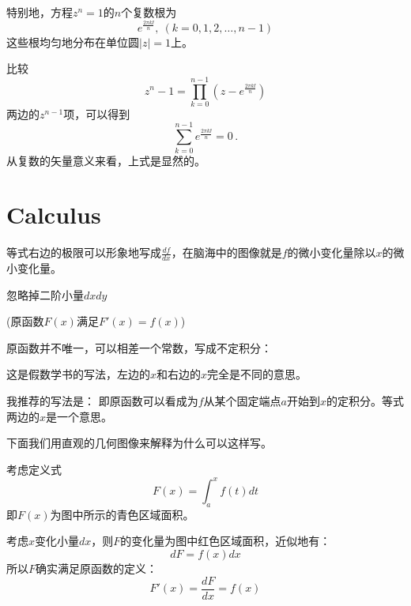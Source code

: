 \documentclass[CJK]{beamer}
\begin{document}
\begin{frame}
\bch
特别地，方程$z^n=1$的$n$个复数根为
$$e^{\frac{2\pi k \ii}{n}}, \ (k=0,1,2,\ldots,n-1)$$
这些根均匀地分布在单位圆$|z|=1$上。

比较
$$z^n-1 = \prod_{k=0}^{n-1}\left(z-e^{\frac{2\pi k \ii}{n}}\right)$$
两边的$z^{n-1}$项，可以得到
$$\sum_{k=0}^{n-1} e^{\frac{2\pi k \ii}{n}} = 0\, .$$
从复数的矢量意义来看，上式是显然的。
\ech
\end{frame}


\section{Calculus}

\begin{frame}
\bch
{}

等式右边的极限可以形象地写成$\frac{df}{dx}$，在脑海中的图像就是$f$的微小变化量除以$x$的微小变化量。

\ech
\end{frame}

\begin{frame}
  \bch

  忽略掉二阶小量$dxdy$
  \ech
\end{frame}

\begin{frame}
\bch
{}
(原函数$F(x)$满足$F'(x) = f(x)$)

\ech
\end{frame}

\begin{frame}
\bch
原函数并不唯一，可以相差一个常数，写成不定积分：

这是假数学书的写法，左边的$x$和右边的$x$完全是不同的意思。

我推荐的写法是：
即原函数可以看成为$f$从某个固定端点$a$开始到$x$的定积分。等式两边的$x$是一个意思。

下面我们用直观的几何图像来解释为什么可以这样写。

\ech
\end{frame}


\begin{frame}
\bch
考虑定义式$$ F(x) = \int_a^x f(t) dt$$
即$F(x)$为图中所示的青色区域面积。

考虑$x$变化小量$dx$，则$F$的变化量为图中红色区域面积，近似地有：
$$d F = f(x) dx$$
所以$F$确实满足原函数的定义：
$$F'(x) = \frac{dF}{dx} = f(x)$$

\emini
{}
\emini

\ech
\end{frame}
\end{document}
